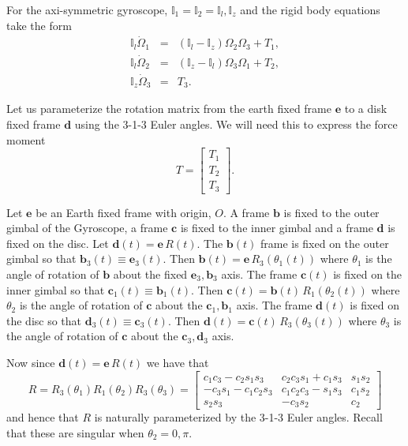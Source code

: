 \documentclass[graybox,envcountchap,sectrefs]{svmonoMuga}
\begin{document}
For the axi-symmetric gyroscope, $\mathbb{I}_1=\mathbb{I}_2=\mathbb{I}_l,\mathbb{I}_z$
and the rigid body equations take the form
\begin{eqnarray}
\mathbb{I}_l\dot{\Omega}_1 & = & (\mathbb{I}_l-\mathbb{I}_z)\Omega_2 \Omega_3 + T_1, \label{eq:AxiSym1}\\
\mathbb{I}_l\dot{\Omega}_2 & = & (\mathbb{I}_z-\mathbb{I}_l)\Omega_3 \Omega_1 + T_2, \label{eq:AxiSym2}\\
\mathbb{I}_z\dot{\Omega}_3 & = &  T_3. \label{eq:AxiSym3}
\end{eqnarray}


Let us parameterize the rotation matrix from the earth fixed frame $\mathbf{e}$ to a disk fixed frame $\mathbf{d}$ using the 3-1-3 Euler angles.  We will need this to express the force moment
\[T=\left[\begin{array}{c} T_1 \\ T_2\\ T_3
\end{array}\right].
\]

Let $\mathbf{e}$ be an Earth fixed frame with origin, $O$. A frame $\mathbf{b}$ is fixed to the outer gimbal of the Gyroscope, a frame $\mathbf{c}$ is fixed to the inner gimbal and a frame $\mathbf{d}$ is fixed on the 
disc. Let $\mathbf{d}(t)=\mathbf{e}\,R(t)$.
The $\mathbf{b}(t)$ frame is fixed on the outer gimbal so that $\mathbf{b}_3(t)\equiv \mathbf{e}_3(t)$. Then $\mathbf{b}(t)=\mathbf{e}\,R_3(\theta_1(t))$ where $\theta_1$ is the angle of rotation of $\mathbf{b}$ about the fixed $\mathbf{e}_3, \mathbf{b}_3$ 
axis.
The frame $\mathbf{c}(t)$ is fixed on the inner gimbal so that $\mathbf{c}_1(t)\equiv \mathbf{b}_1(t)$. Then $\mathbf{c}(t)=\mathbf{b}(t)\,R_1(\theta_2(t))$ where
$\theta_2$ is the angle of rotation of $\mathbf{c}$ about the $\mathbf{c}_1, \mathbf{b}_1$ axis.
The frame $\mathbf{d}(t)$ is fixed on the disc so that $\mathbf{d}_3(t)\equiv \mathbf{c}_3(t)$. Then $\mathbf{d}(t)=\mathbf{c}(t)\,R_3(\theta_3(t))$ where
$\theta_3$ is the angle of rotation of $\mathbf{c}$ about the $\mathbf{c}_3, \mathbf{d}_3$ axis.

Now since $\mathbf{d}(t)=\mathbf{e}\,R(t)$ we have that
\begin{equation}\label{eq:EulerAngles}
R=R_3(\theta_1)R_1(\theta_2)R_3(\theta_3)
=\left[\begin{array}{ccc}
c_1c_3-c_2s_1s_3 & c_2c_3s_1+c_1s_3 & s_1s_2  \\
-c_3s_1-c_1c_2s_3 & c_1c_2c_3-s_1s_3 & c_1s_2\\
s_2s_3 & -c_3s_2 & c_2
\end{array}
\right]
\end{equation}
and hence that $R$ is naturally parameterized by the 3-1-3 Euler angles. Recall that these are singular when $\theta_2=0,\pi$.
\end{document}

